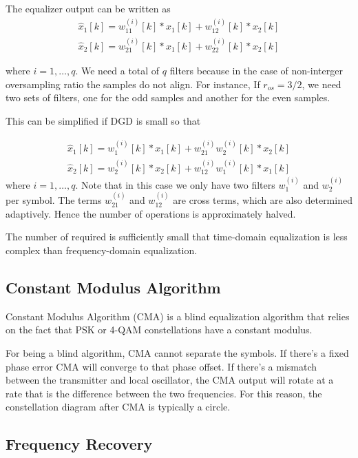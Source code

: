 \documentclass[a4paper]{article}
\begin{document}
The equalizer output can be written as
\begin{align}
\hat{x}_{1}[k] = w^{(i)}_{11}[k]\ast x_1[k] + w^{(i)}_{12}[k]\ast x_2[k] \\
\hat{x}_{2}[k] = w^{(i)}_{21}[k]\ast x_1[k] + w^{(i)}_{22}[k]\ast x_2[k]
\end{align}

where $i = 1, \ldots, q$. We need a total of $q$ filters because in the case of non-interger oversampling ratio the samples do not align. For instance, If $r_{os} = 3/2$, we need two sets of filters, one for the odd samples and another for the even samples.

This can be simplified if DGD is small so that 

\begin{align}
\hat{x}_{1}[k] = w^{(i)}_{1}[k]\ast x_1[k] + w_{21}^{(i)}w^{(i)}_{2}[k]\ast x_2[k] \\
\hat{x}_{2}[k] = w^{(i)}_{2}[k]\ast x_2[k] + w_{12}^{(i)}w^{(i)}_{1}[k]\ast x_1[k]
\end{align}
where $i = 1, \ldots, q$. Note that in this case we only have two filters $w^{(i)}_{1}$ and $w^{(i)}_{2}$ per symbol. The terms $w_{21}^{(i)}$ and $w_{12}^{(i)}$ are cross terms, which are also determined adaptively. Hence the number of operations is approximately halved.

The number of required is sufficiently small that time-domain equalization is less complex than frequency-domain equalization.

\subsection{Constant Modulus Algorithm}

Constant Modulus Algorithm (CMA) is a blind equalization algorithm that relies on the fact that PSK or 4-QAM constellations have a constant modulus. 

For being a blind algorithm, CMA cannot separate the symbols. If there's a fixed phase error CMA will converge to that phase offset. If there's a mismatch between the transmitter and local oscillator, the CMA output will rotate at a rate that is the difference between the two frequencies. For this reason, the constellation diagram after CMA is typically a circle. 


\subsection{Frequency Recovery}
\cite{Hoffmann2008} 
\end{document}

